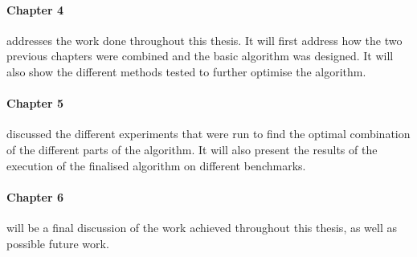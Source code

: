 \paragraph{Chapter 4}addresses the work done throughout this thesis. It will first address how the two previous chapters were combined and the basic algorithm was designed. It will also show the different methods tested to further optimise the algorithm.

\paragraph{Chapter 5}discussed the different experiments that were run to find the optimal combination of the different parts of the algorithm. It will also present the results of the execution of the finalised algorithm on different benchmarks.

\paragraph{Chapter 6}will be a final discussion of the work achieved throughout this thesis, as well as possible future work.









